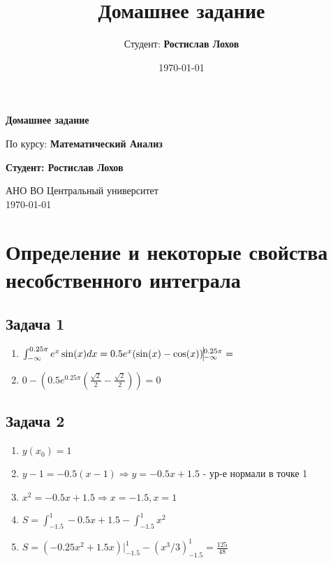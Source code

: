 \documentclass[a4paper,12pt]{article}
\title{Домашнее задание}
\author{Студент: \textbf{Ростислав Лохов}}
\date{\today}
\begin{document}
\begin{titlepage}
	\centering
	\vspace*{1cm}

	\Huge
	\textbf{Домашнее задание}

	\vspace{0.5cm}
	\LARGE
	По курсу: \textbf{Математический Анализ}

	\vspace{1.5cm}

	\textbf{Студент: Ростислав Лохов}

	\vfill

	\Large
	АНО ВО Центральный университет\\
	\vspace{0.3cm}
	\today

\end{titlepage}

\tableofcontents
\newpage

\section{Определение и некоторые свойства несобственного интеграла}

\subsection{Задача 1}

\begin{enumerate}
    \item $\int_{-\infty}^{0.25\pi} e^x\sin(x)dx = 0.5e^x(\sin(x)-\cos(x)) \vline_{-\infty}^{0.25\pi}=$
    \item $0-(0.5e^{0.25\pi}(\frac{\sqrt{2}}{2} - \frac{\sqrt{2}}{2})) = 0$ 
\end{enumerate}

\subsection{Задача 2}
\begin{enumerate}
    \item $y(x_0) = 1$
    \item $y-1=-0.5(x-1) \Rightarrow y=-0.5x+1.5$ - ур-е нормали в точке 1
    \item $x^2=-0.5x+1.5 \Rightarrow x = -1.5, x=1$
    \item $S = \int_{-1.5}^{1} -0.5x+1.5 - \int_{-1.5}^{1} x^2$
    \item $S = (-0.25x^2+1.5x)|_{-1.5}^1 - (x^3/3)_{-1.5}^1 = \frac{125}{48}$

\end{enumerate}
\end{document}
